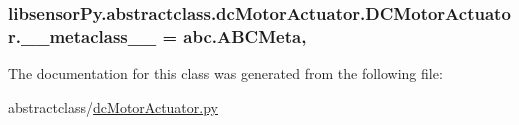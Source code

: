 \subsubsection[{\+\_\+\+\_\+metaclass\+\_\+\+\_\+}]{\setlength{\rightskip}{0pt plus 5cm}libsensor\+Py.\+abstractclass.\+dc\+Motor\+Actuator.\+D\+C\+Motor\+Actuator.\+\_\+\+\_\+metaclass\+\_\+\+\_\+ = abc.\+A\+B\+C\+Meta\hspace{0.3cm}{\ttfamily [static]}, {\ttfamily [private]}}\label{classlibsensorPy_1_1abstractclass_1_1dcMotorActuator_1_1DCMotorActuator_a6c7d031e06994a8e1a9c251c61f8c0d5}


The documentation for this class was generated from the following file\+:\begin{DoxyCompactItemize}
\item 
abstractclass/\hyperlink{dcMotorActuator_8py}{dc\+Motor\+Actuator.\+py}\end{DoxyCompactItemize}

